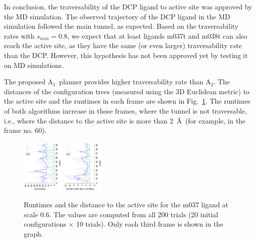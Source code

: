 \documentclass[usletter, 10pt, conference]{ieeeconf} %
\def\smin{s_{min}}
\def\RA{A$_{1}$}
\def\RB{A$_{2}$}
\begin{document}
In conclusion, the traversability of the DCP ligand to active site was approved by the MD simulation.
The observed trajectory of the DCP ligand in the MD simulation followed the main tunnel, as expected.
Based on the traversability rates with $\smin=0.8$, we expect that at least ligands m037t and m038t can also reach the active site, as
they have the same (or even larger) traversability rate than the DCP.
However, this hypothesis has not been approved yet by testing it on MD simulations.

The proposed \RA\ planner provides higher traversability rate than \RB.
The distances of the configuration trees (measured using the 3D Euclidean metric) to the active site and the runtimes in each frame
are shown in Fig.~\ref{fig::comparison}.
The runtimes of both algorithms increase in those frames, where the tunnel is not traversable, i.e., where the distance
to the active site is more than 2~\AA\ (for example, in the frame no. 60).

{\def\a{270}
\begin{figure}[hb]
\centering
\includegraphics[width=0.18\textwidth,angle=\a]{fig/crop1}
\includegraphics[width=0.18\textwidth,angle=\a]{fig/crop2}
\caption{\label{fig::comparison}
    Runtimes and the distance to the active site for the m037 ligand at scale 0.6.
    The values are computed from all 200 trials (20 initial configurations $\times$ 10 trials).
    Only each third frame is shown in the graph.
}
\end{figure}
}
\end{document}
